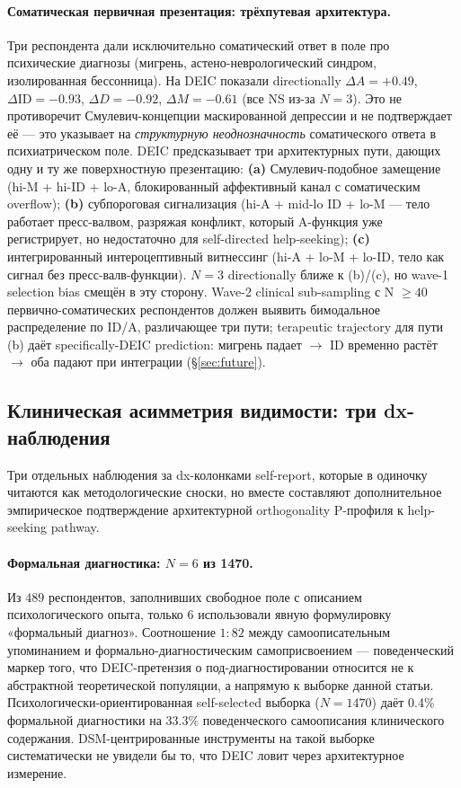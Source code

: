 \paragraph{Соматическая первичная презентация: трёхпутевая архитектура.} Три респондента дали исключительно соматический ответ в поле про психические диагнозы (мигрень, астено-неврологический синдром, изолированная бессонница). На DEIC показали directionally $\Delta A = +0.49$, $\Delta \text{ID} = -0.93$, $\Delta D = -0.92$, $\Delta M = -0.61$ (все NS из-за $N = 3$). Это не противоречит Смулевич-концепции маскированной депрессии и не подтверждает её --- это указывает на \emph{структурную неоднозначность} соматического ответа в психиатрическом поле. DEIC предсказывает три архитектурных пути, дающих одну и ту же поверхностную презентацию: \textbf{(a)} Смулевич-подобное замещение (hi-M + hi-ID + lo-A, блокированный аффективный канал с соматическим overflow); \textbf{(b)} субпороговая сигнализация (hi-A + mid-lo ID + lo-M --- тело работает пресс-валвом, разряжая конфликт, который A-функция уже регистрирует, но недостаточно для self-directed help-seeking); \textbf{(c)} интегрированный интероцептивный витнессинг (hi-A + lo-M + lo-ID, тело как сигнал без пресс-валв-функции). $N = 3$ directionally ближе к (b)/(c), но wave-1 selection bias смещён в эту сторону. Wave-2 clinical sub-sampling с N $\geq 40$ первично-соматических респондентов должен выявить бимодальное распределение по ID/A, различающее три пути; terapeutic trajectory для пути (b) даёт specifically-DEIC prediction: мигрень падает $\to$ ID временно растёт $\to$ оба падают при интеграции (§\ref{sec:future}).

\subsection{Клиническая асимметрия видимости: три dx-наблюдения}
\label{subsec:dx_asymmetry_trio}

Три отдельных наблюдения за dx-колонками self-report, которые в одиночку читаются как методологические сноски, но вместе составляют дополнительное эмпирическое подтверждение архитектурной orthogonality P-профиля к help-seeking pathway.

\paragraph{Формальная диагностика: $N = 6$ из 1470.} Из $489$ респондентов, заполнивших свободное поле с описанием психологического опыта, только $6$ использовали явную формулировку «формальный диагноз». Соотношение $1:82$ между самоописательным упоминанием и формально-диагностическим самоприсвоением --- поведенческий маркер того, что DEIC-претензия о под-диагностировании относится не к абстрактной теоретической популяции, а напрямую к выборке данной статьи. Психологически-ориентированная self-selected выборка ($N = 1470$) даёт 0.4\% формальной диагностики на $33.3\%$ поведенческого самоописания клинического содержания. DSM-центрированные инструменты на такой выборке систематически не увидели бы то, что DEIC ловит через архитектурное измерение.

